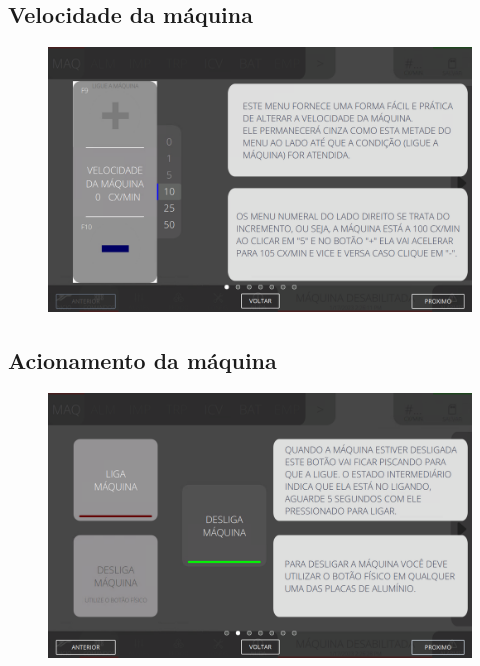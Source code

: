 \subsection{Velocidade da máquina}
\vspace*{\fill}
\begin{figure}[h]
    \centering
    \includegraphics[width=576 px,height=360 px]{src/imagesICV/02-machine/2.png}
\end{figure}
\vspace*{\fill}

\newpage
\thispagestyle{fancy}
\vspace*{40 pt}
\subsection{Acionamento da máquina}
\vspace*{\fill}
\begin{figure}[h]
    \centering
    \includegraphics[width=576 px,height=360 px]{src/imagesICV/02-machine/3.png}
\end{figure}
\vspace*{\fill}

